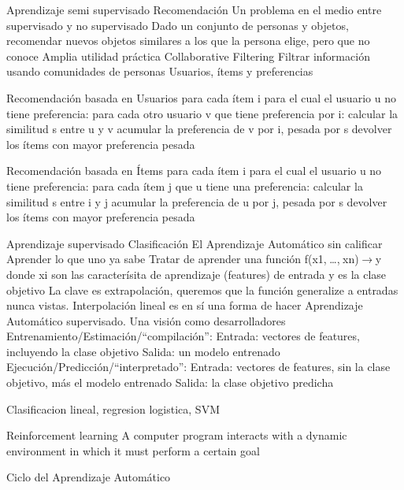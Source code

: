 Aprendizaje semi supervisado
Recomendación
Un problema en el medio entre supervisado y no supervisado
Dado un conjunto de personas y objetos, recomendar nuevos objetos similares a los que la persona elige, pero que no conoce
Amplia utilidad práctica
Collaborative Filtering
Filtrar información usando comunidades de personas
Usuarios, ítems y preferencias

Recomendación basada en Usuarios
para cada ítem i para el cual el usuario u no tiene preferencia:
para cada otro usuario v que tiene preferencia por i:
calcular la similitud s entre u y v
acumular la preferencia de v por i, pesada por s
devolver los ítems con mayor preferencia pesada

Recomendación basada en Ítems
para cada ítem i para el cual el usuario u no tiene preferencia:
para cada ítem j que u tiene una preferencia:
calcular la similitud s entre i y j
acumular la preferencia de u por j, pesada por s
devolver los ítems con mayor preferencia pesada

Aprendizaje supervisado
Clasificación
El Aprendizaje Automático sin calificar
Aprender lo que uno ya sabe
Tratar de aprender una función f(x1, …, xn) → y donde
xi son las caracterísita de aprendizaje (features) de entrada
y es la clase objetivo
La clave es extrapolación, queremos que la función generalize a entradas nunca vistas.
Interpolación lineal es en sí una forma de hacer Aprendizaje Automático supervisado.
Una visión como desarrolladores
Entrenamiento/Estimación/“compilación”:
Entrada: vectores de features, incluyendo la clase objetivo
Salida: un modelo entrenado
Ejecución/Predicción/“interpretado”:
Entrada: vectores de features, sin la clase objetivo, más el modelo entrenado
Salida: la clase objetivo predicha

Clasificacion lineal, regresion logistica, SVM

Reinforcement learning  A computer program interacts with a dynamic environment in which it must perform a certain goal


Ciclo del Aprendizaje Automático

